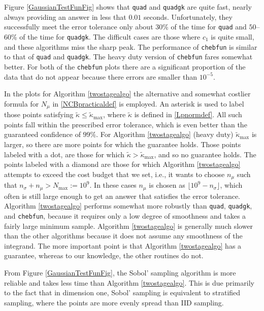 \documentclass[graybox]{svmult}
\newcommand{\tkappa}{\tilde{\kappa}}
\begin{document}
Figure \ref{GaussianTestFunFig} shows that {\tt quad} and {\tt quadgk} are quite fast, nearly always providing an answer in less that $0.01$ seconds.  Unfortunately, they successfully meet the error tolerance only about $30\%$ of the time for {\tt quad} and $50$--$60\%$ of the time for {\tt quadgk}.  The difficult cases are those where $c_1$ is quite small, and these algorithms miss the sharp peak.  The performance of {\tt chebfun} is similar to that of {\tt quad} and {\tt quadgk}.  The heavy duty version of  {\tt chebfun} fares somewhat better.  For both of the {\tt chebfun} plots there are a significant proportion of the data that do not appear because there errors are smaller than $10^{-5}$.

In the plots for Algorithm \ref{twostagealgo} the alternative and somewhat costlier formula for $N_{\mu}$ in \eqref{NCBpracticaldef} is employed. An asterisk is used to label those points satisfying $\tkappa \le \tkappa_{\max}$, where $\tkappa$ is defined in \eqref{Lpnormdef}. All such points fall within the prescribed error tolerance,
which is even better than the guaranteed confidence of $99\%$.  
For Algorithm \ref{twostagealgo} (heavy duty) $\tkappa_{\max}$ is larger, so there are more points for which the guarantee holds.  Those points labeled with a dot, are those for which $\tkappa > \tkappa_{\max}$, and so no guarantee holds. The points labeled with a diamond are those for which Algorithm \ref{twostagealgo} attempts to exceed the cost budget that we set, i.e., it wants to choose $n_\mu$ such that $n_{\sigma}+n_\mu > N_{\max}:=10^9$. In these cases $n_\mu$ is chosen as $\lfloor 10^9 - n_\sigma \rfloor$, which often is still large enough to get an answer that satisfies the error tolerance. 
Algorithm \ref{twostagealgo} performs somewhat more robustly than {\tt quad}, {\tt quadgk}, and {\tt chebfun}, because it requires only a low degree of smoothness and takes a fairly large minimum sample. Algorithm \ref{twostagealgo} is generally much slower than the other algorithms because it does not assume any smoothness of the integrand. The more important point is that Algorithm \ref{twostagealgo} has a guarantee, whereas to our knowledge, the other routines do not.

From Figure \ref{GaussianTestFunFig}, the Sobol' sampling algorithm is more reliable and takes less time than Algorithm \ref{twostagealgo}.  This is due primarily to the fact that in dimension one, Sobol' sampling is equivalent to stratified sampling, where the points are more evenly spread than IID sampling.
\end{document}
